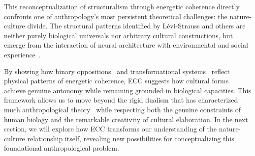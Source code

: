 This reconceptualization of structuralism through energetic coherence directly confronts one of anthropology's most persistent theoretical challenges: the nature-culture divide. The structural patterns identified by Lévi-Strauss and others are neither purely biological universals nor arbitrary cultural constructions, but emerge from the interaction of neural architecture with environmental and social experience~\cite{descola2013beyond,strathern2004partial}.

By showing how binary oppositions~ and transformational systems~ reflect physical patterns of energetic coherence, ECC suggests how cultural forms achieve genuine autonomy while remaining grounded in biological capacities. This framework allows us to move beyond the rigid dualism that has characterized much anthropological theory~ while respecting both the genuine constraints of human biology and the remarkable creativity of cultural elaboration. In the next section, we will explore how ECC transforms our understanding of the nature-culture relationship itself, revealing new possibilities for conceptualizing this foundational anthropological problem.
